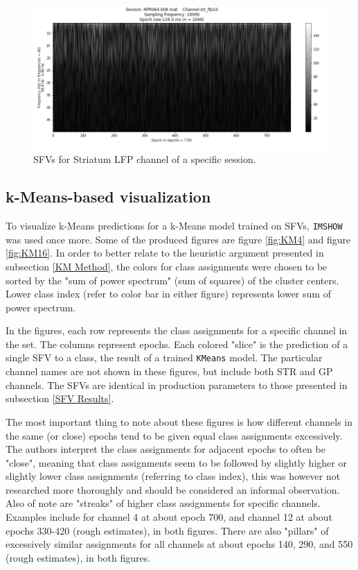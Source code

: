 \documentclass{article}
\begin{document}
\begin{figure}[H]
    \centering
    \centerline{\includegraphics[width=1\textwidth]{images/STR2.png}}
    \caption{SFVs for Striatum LFP channel of a specific session.}
    \label{fig:STR2}
\end{figure}

\subsection{k-Means-based visualization}\label{KM Results}

To visualize k-Means predictions for a k-Means model trained on SFVs, \texttt{IMSHOW} was used once more.
Some of the produced figures are figure \ref{fig:KM4} and figure \ref{fig:KM16}.
In order to better relate to the heuristic argument presented in subsection \ref{KM Method}, the colors for class assignments were chosen to be sorted by the "sum of power spectrum" (sum of squares) of the cluster centers.
Lower class index (refer to color bar in either figure) represents lower sum of power spectrum.

In the figures, each row represents the class assignments for a specific channel in the set.
The columns represent epochs.
Each colored "slice" is the prediction of a single SFV to a class, the result of a trained \texttt{KMeans} model.
The particular channel names are not shown in these figures, but include both STR and GP channels.
The SFVs are identical in production parameters to those presented in subsection \ref{SFV Results}.

The most important thing to note about these figures is how different channels in the same (or close) epochs tend to be given equal class assignments excessively. 
The authors interpret the class assignments for adjacent epochs to often be "close", meaning that class assignments seem to be followed by slightly higher or slightly lower class assignments (referring to class index), this was however not researched more thoroughly and should be considered an informal observation.
Also of note are "streaks" of higher class assignments for specific channels.
Examples include for channel 4 at about epoch 700, and channel 12 at about epochs 330-420 (rough estimates), in both figures.
There are also "pillars" of excessively similar assignments for all channels at about epochs 140, 290, and 550 (rough estimates), in both figures.
\end{document}
